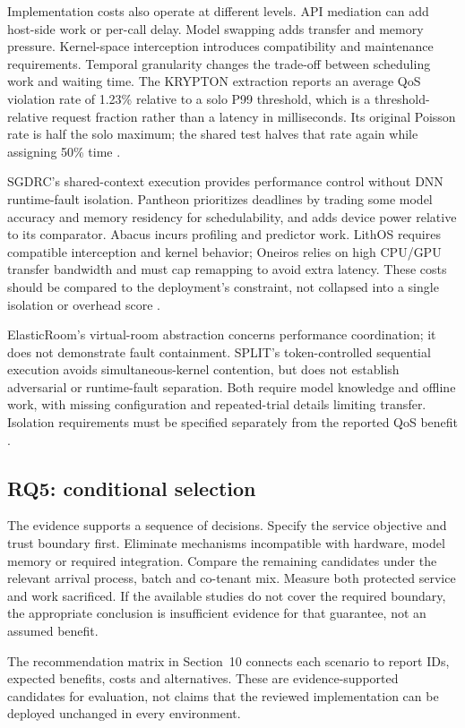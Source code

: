 Implementation costs also operate at different levels. API mediation can add host-side work or per-call delay. Model swapping adds transfer and memory pressure. Kernel-space interception introduces compatibility and maintenance requirements. Temporal granularity changes the trade-off between scheduling work and waiting time. The KRYPTON extraction reports an average QoS violation rate of 1.23\% relative to a solo P99 threshold, which is a threshold-relative request fraction rather than a latency in milliseconds. Its original Poisson rate is half the solo maximum; the shared test halves that rate again while assigning 50\% time \cite{P014}.

SGDRC's shared-context execution provides performance control without DNN runtime-fault isolation. Pantheon prioritizes deadlines by trading some model accuracy and memory residency for schedulability, and adds device power relative to its comparator. Abacus incurs profiling and predictor work. LithOS requires compatible interception and kernel behavior; Oneiros relies on high CPU/GPU transfer bandwidth and must cap remapping to avoid extra latency. These costs should be compared to the deployment's constraint, not collapsed into a single isolation or overhead score \cite{s021,s022,s024,s025,s026}.

ElasticRoom's virtual-room abstraction concerns performance coordination; it does not demonstrate fault containment. SPLIT's token-controlled sequential execution avoids simultaneous-kernel contention, but does not establish adversarial or runtime-fault separation. Both require model knowledge and offline work, with missing configuration and repeated-trial details limiting transfer. Isolation requirements must be specified separately from the reported QoS benefit \cite{s028,s029}.

\subsection{RQ5: conditional selection}
The evidence supports a sequence of decisions. Specify the service objective and trust boundary first. Eliminate mechanisms incompatible with hardware, model memory or required integration. Compare the remaining candidates under the relevant arrival process, batch and co-tenant mix. Measure both protected service and work sacrificed. If the available studies do not cover the required boundary, the appropriate conclusion is insufficient evidence for that guarantee, not an assumed benefit.

The recommendation matrix in Section~10 connects each scenario to report IDs, expected benefits, costs and alternatives. These are evidence-supported candidates for evaluation, not claims that the reviewed implementation can be deployed unchanged in every environment.

